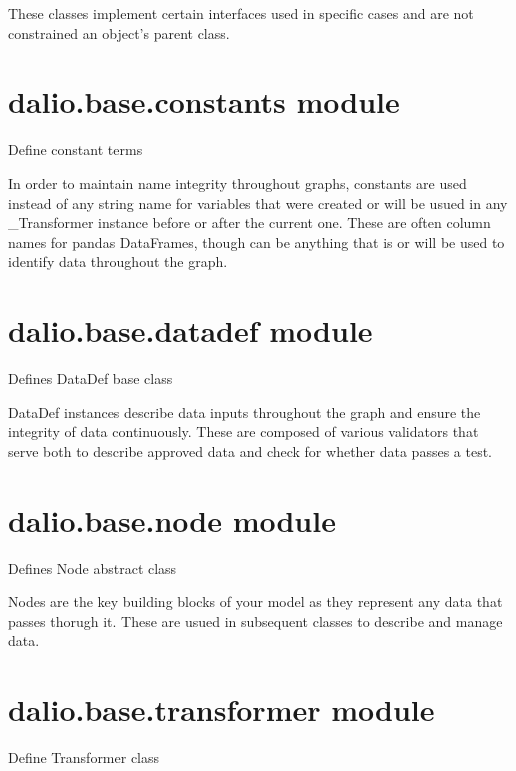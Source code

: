 \documentclass[letterpaper,10pt,english]{sphinxmanual}
\begin{document}
These classes implement certain interfaces used in specific cases and are not
constrained an object’s parent class.


\section{dalio.base.constants module}
\label{\detokenize{dalio.base:module-dalio.base.constants}}\label{\detokenize{dalio.base:dalio-base-constants-module}}
Define constant terms

In order to maintain name integrity throughout graphs, constants are used
instead of any string name for variables that were created or will be usued in
any \_Transformer instance before or after the current one. These are often
column names for pandas DataFrames, though can be anything that is or will be
used to identify data throughout the graph.


\section{dalio.base.datadef module}
\label{\detokenize{dalio.base:module-dalio.base.datadef}}\label{\detokenize{dalio.base:dalio-base-datadef-module}}
Defines DataDef base class

DataDef instances describe data inputs throughout the graph and ensure the
integrity of data continuously. These are composed of various validators that
serve both to describe approved data and check for whether data passes a test.


\section{dalio.base.node module}
\label{\detokenize{dalio.base:module-dalio.base.node}}\label{\detokenize{dalio.base:dalio-base-node-module}}
Defines Node abstract class

Nodes are the key building blocks of your model as they represent any data
that passes thorugh it. These are usued in subsequent classes to describe and
manage data.


\section{dalio.base.transformer module}
\label{\detokenize{dalio.base:module-dalio.base.transformer}}\label{\detokenize{dalio.base:dalio-base-transformer-module}}
Define Transformer class
\end{document}
